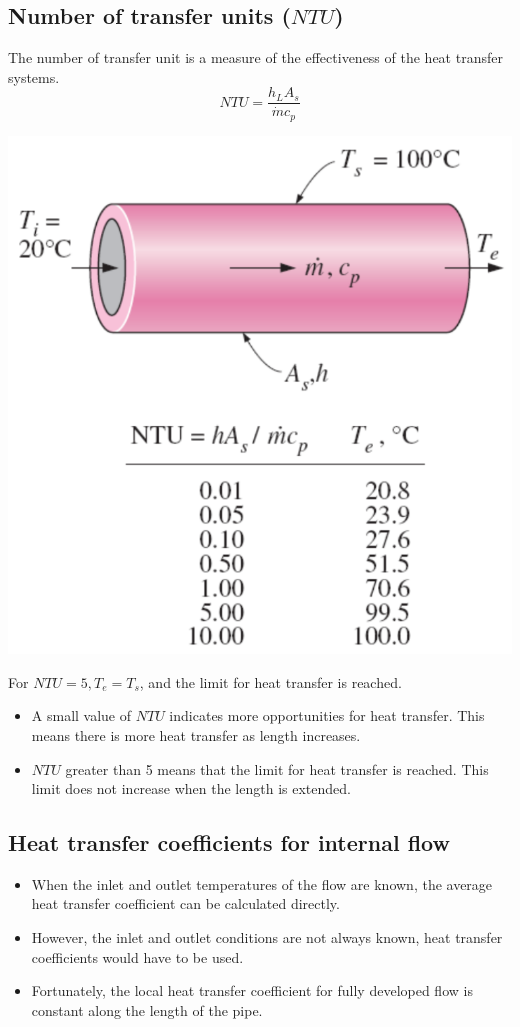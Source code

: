 \documentclass[11pt]{article}
\begin{document}
 \newpage

\subsection{Number of transfer units (\(NTU\))}
\label{sec:org3cbd0a7}
The number of transfer unit is a measure of the effectiveness of the heat transfer systems.
\[NTU = \frac{h_L A_s}{\dot{m} c_p}\]
\begin{center}
\includegraphics[width=.9\linewidth]{./images/number-of-transfer-units-diagram.png}
\end{center}

For \(NTU = 5, T_e = T_s\), and the limit for heat transfer is reached.
\begin{itemize}
\item A small value of \(NTU\) indicates more opportunities for heat transfer. This means there is more heat transfer as length increases.
\item \(NTU\) greater than 5 means that the limit for heat transfer is reached. This limit does not increase when the length is extended.
\end{itemize}

\subsection{Heat transfer coefficients for internal flow}
\label{sec:orgf8212d4}
\begin{itemize}
\item When the inlet and outlet temperatures of the flow are known, the average heat transfer coefficient can be calculated directly.
\item However, the inlet and outlet conditions are not always known, heat transfer coefficients would have to be used.
\item Fortunately, the local heat transfer coefficient for fully developed flow is constant along the length of the pipe.
\end{itemize}
\end{document}
